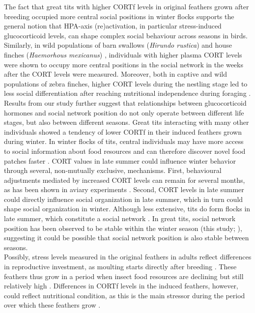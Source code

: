\documentclass[10pt, twoside]{book} %
\begin{document}
The fact that great tits with higher CORTf levels in original feathers grown after breeding occupied more central social positions in winter flocks supports the general notion that HPA-axis (re)activation, in particular stress-induced glucocorticoid levels, can shape complex social behaviour across seasons in birds. Similarly, in wild populations of barn swallows (\textit{Hirundo rustica}) \citep{Levin2016} and house finches (\textit{Haemorhous mexicanus}) \citep{Moyers2018}, individuals with higher plasma CORT levels were shown to occupy more central positions in the social network in the weeks after the CORT levels were measured. Moreover, both in captive and wild populations of zebra finches, higher CORT levels during the nestling stage led to less social differentiation after reaching nutritional independence during foraging \citep{Boogert2014, Brandl2019}. Results from our study further suggest that relationships between glucocorticoid hormones and social network position do not only operate between different life stages, but also between different seasons. Great tits interacting with many other individuals showed a tendency of lower CORTf in their induced feathers grown during winter. In winter flocks of tits, central individuals may have more access to social information about food resources and can therefore discover novel food patches faster \citep{Aplin2012, Farine2015b, Firth2016}. CORT values in late summer could influence winter behavior through several, non-mutually exclusive, mechanisms. First, behavioural adjustments mediated by increased CORT levels can remain for several months, as has been shown in aviary experiments \citep{Spencer2007, Boogert2013}. Second, CORT levels in late summer could directly influence social organization in late summer, which in turn could shape social organization in winter. Although less extensive, tits do form flocks in late summer, which constitute a social network \citep{Ekman1989}. In great tits, social network position has been observed to be stable within the winter season (this study; \citealt{Aplin2015a}), suggesting it could be possible that social network position is also stable between seasons.\\

Possibly, stress levels measured in the original feathers in adults reflect differences in reproductive investment, as moulting starts directly after breeding \citep{Dhondt1973}. These feathers thus grow in a period when insect food resources are declining but still relatively high \citep{Naef-daenzer2008}. Differences in CORTf levels in the induced feathers, however, could reflect nutritional condition, as this is the main stressor during the period over which these feathers grow \citep{Jansson1981, Brittingham1988, Perdeck2000}.\\
\end{document}
